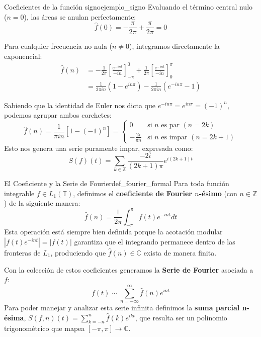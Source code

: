 \begin{ejemplo}{Coeficientes de la función signo}{ejemplo_signo}
Evaluando el término central nulo ($n = 0$), las áreas se anulan perfectamente:
\begin{equation*}
    \hat{f}(0) = -\frac{\pi}{2\pi} + \frac{\pi}{2\pi} = 0
\end{equation*}

Para cualquier frecuencia no nula ($n \ne 0$), integramos directamente la exponencial:
\begin{align*}
    \hat{f}(n) &= -\frac{1}{2\pi} \left[ \frac{e^{-int}}{-in} \right]_{-\pi}^{0} + \frac{1}{2\pi} \left[ \frac{e^{-int}}{-in} \right]_{0}^{\pi} \\
    &= \frac{1}{2\pi i n} \left( 1 - e^{in\pi} \right) - \frac{1}{2\pi i n} \left( e^{-in\pi} - 1 \right)
\end{align*}

Sabiendo que la identidad de Euler nos dicta que $e^{-in\pi} = e^{in\pi} = (-1)^n$, podemos agrupar ambos corchetes:
\begin{equation*}
    \hat{f}(n) = \frac{1}{\pi i n} \left[ 1 - (-1)^n \right] = \begin{cases} 
        0 & \text{si } n \text{ es par } (n=2k) \\ 
        -\frac{2i}{\pi n} & \text{si } n \text{ es impar } (n=2k+1) 
    \end{cases}
\end{equation*}
Esto nos genera una serie puramente impar, expresada como:
\begin{equation*}
    S(f)(t) = \sum_{k \in \mathbb{Z}} \frac{-2i}{(2k+1)\pi} e^{i(2k+1)t}
\end{equation*}
\end{ejemplo}

\begin{definicion}{El Coeficiente y la Serie de Fourier}{def_fourier_formal}
Para toda función integrable $f \in L_1(\mathbb{T})$, definimos el \textbf{coeficiente de Fourier $n$-ésimo} (con $n \in \mathbb{Z}$) de la siguiente manera:
\begin{equation*}
    \hat{f}(n) = \frac{1}{2\pi} \int_{-\pi}^{\pi} f(t) e^{-int} dt
\end{equation*}
Esta operación está siempre bien definida porque la acotación modular $|f(t)e^{-int}| = |f(t)|$ garantiza que el integrando permanece dentro de las fronteras de $L_1$, produciendo que $\hat{f}(n) \in \mathbb{C}$ exista de manera finita.

Con la colección de estos coeficientes generamos la \textbf{Serie de Fourier} asociada a $f$:
\begin{equation*}
    f(t) \sim \sum_{n=-\infty}^{\infty} \hat{f}(n) e^{int}
\end{equation*}
Para poder manejar y analizar esta serie infinita definimos la \textbf{suma parcial n-ésima}, $S(f,n)(t) = \sum_{k=-n}^{n} \hat{f}(k) e^{ikt}$, que resulta ser un polinomio trigonométrico que mapea $[-\pi,\pi] \to \mathbb{C}$.
\end{definicion}

